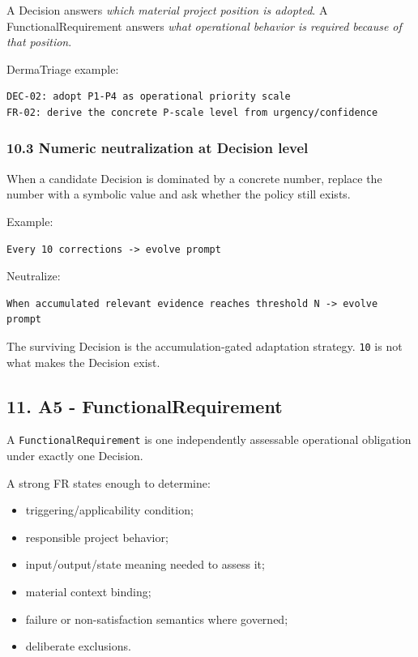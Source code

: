\documentclass[11pt,a4paper]{article}
\providecommand{\tightlist}{\setlength{\itemsep}{0pt}\setlength{\parskip}{0pt}}
\begin{document}
A Decision answers \emph{which material project position is adopted}. A
FunctionalRequirement answers \emph{what operational behavior is
required because of that position}.

DermaTriage example:

\begin{verbatim}
DEC-02: adopt P1-P4 as operational priority scale
FR-02: derive the concrete P-scale level from urgency/confidence
\end{verbatim}

\subsubsection{10.3 Numeric neutralization at Decision
level}\label{103-numeric-neutralization-at-decision-level}

When a candidate Decision is dominated by a concrete number, replace the
number with a symbolic value and ask whether the policy still exists.

Example:

\begin{verbatim}
Every 10 corrections -> evolve prompt
\end{verbatim}

Neutralize:

\begin{verbatim}
When accumulated relevant evidence reaches threshold N -> evolve prompt
\end{verbatim}

The surviving Decision is the accumulation-gated adaptation strategy.
\texttt{10} is not what makes the Decision exist.

\subsection{11. A5 -
FunctionalRequirement}\label{11-a5---functionalrequirement}

A \texttt{FunctionalRequirement} is one independently assessable
operational obligation under exactly one Decision.

A strong FR states enough to determine:

\begin{itemize}
\tightlist
\item
  triggering/applicability condition;
\item
  responsible project behavior;
\item
  input/output/state meaning needed to assess it;
\item
  material context binding;
\item
  failure or non-satisfaction semantics where governed;
\item
  deliberate exclusions.
\end{itemize}
\end{document}
